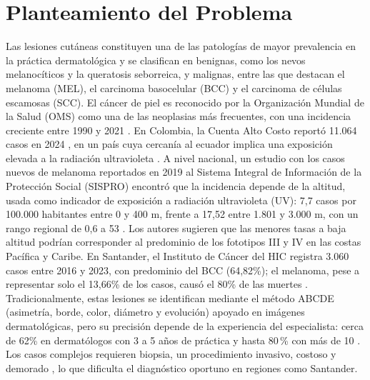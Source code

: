 \chapter{Planteamiento del Problema}
Las lesiones cutáneas constituyen una de las patologías de mayor prevalencia en la práctica dermatológica y se clasifican en benignas, como los nevos melanocíticos y la queratosis seborreica, y malignas, entre las que destacan el melanoma (MEL), el carcinoma basocelular (BCC) y el carcinoma de células escamosas (SCC). El cáncer de piel es reconocido por la Organización Mundial de la Salud (OMS) como una de las neoplasias más frecuentes, con una incidencia creciente entre 1990 y 2021 \parencite{zhou2025skinburdengbd}. En Colombia, la Cuenta Alto Costo reportó 11.064 casos en 2024 \parencite{elfrente2024cancerpielhic,cuentaaltocosto2025melanoma}, en un país cuya cercanía al ecuador implica una exposición elevada a la radiación ultravioleta \parencite{oliveros2025melanomacolombia}.
A nivel nacional, un estudio con los casos nuevos de melanoma reportados en 2019 al Sistema Integral de Información de la Protección Social (SISPRO) encontró que la incidencia depende de la altitud, usada como indicador de exposición a radiación ultravioleta (UV): 7,7 casos por 100.000 habitantes entre 0 y 400 m, frente a 17,52 entre 1.801 y 3.000 m, con un rango regional de 0,6 a 53 \parencite{oliveros2025melanomacolombia}. Los autores sugieren que las menores tasas a baja altitud podrían corresponder al predominio de los fototipos III y IV en las costas Pacífica y Caribe. En Santander, el Instituto de Cáncer del HIC registra 3.060 casos entre 2016 y 2023, con predominio del BCC (64,82\%); el melanoma, pese a representar solo el 13,66\% de los casos, causó el 80\% de las muertes \parencite{uribe2018bccbucaramanga}.
Tradicionalmente, estas lesiones se identifican mediante el método ABCDE (asimetría, borde, color, diámetro y evolución) apoyado en imágenes dermatológicas, pero su precisión depende de la experiencia del especialista: cerca de 62\% en dermatólogos con 3 a 5 años de práctica y hasta 80\,\% con más de 10 \parencite{chaturvedi2020multiclassskin}. Los casos complejos requieren biopsia, un procedimiento invasivo, costoso y demorado \parencite{pathania2022noninvasivediagnostics,sauter2023dermatopathologyreview}, lo que dificulta el diagnóstico oportuno en regiones como Santander.
